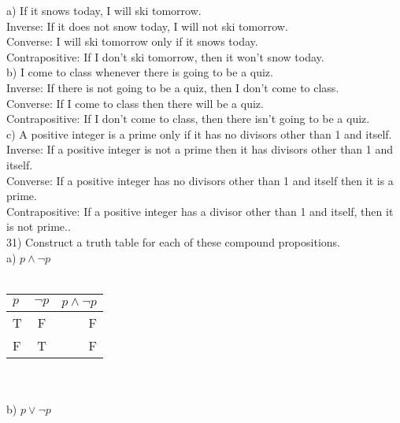 \documentclass{article}
\begin{document}
\begin{flushleft}
\setlength\parindent{24pt}a) If it snows today, I will ski tomorrow.\\
\setlength\parindent{48pt}Inverse: If it does not snow today, I will not ski tomorrow.\\
\setlength\parindent{48pt}Converse: I will ski tomorrow only if it snows today.\\
\setlength\parindent{48pt}Contrapositive: If I don't ski tomorrow, then it won't snow today.\\
\setlength\parindent{24pt}b) I come to class whenever there is going to be a quiz.\\
\setlength\parindent{48pt}Inverse: If there is not going to be a quiz, then I don't come to class.\\
\setlength\parindent{48pt}Converse: If I come to class then there will be a quiz.\\
\setlength\parindent{48pt}Contrapositive: If I don't come to class, then there isn't going to be a quiz.\\
\setlength\parindent{24pt}c) A positive integer is a prime only if it has no divisors other than 1 and itself.\\
\setlength\parindent{48pt}Inverse: If a positive integer is not a prime then it has divisors other than 1 and itself.\\
\setlength\parindent{48pt}Converse: If a positive integer has no divisors other than 1 and itself then it is a prime.\\
\setlength\parindent{48pt}Contrapositive: If a positive integer has a divisor other than 1 and itself, then it is not prime..\\
\setlength\parindent{0pt}31) Construct a truth table for each of these compound propositions.\\
\setlength\parindent{24pt}a) $p \land \neg p$\\
\setlength\parindent{24pt}~\\
\begin{tabular} {| l | c || r |}
  \hline
  $p$ & $\neg p$ & $p \land \neg p$ \\ \hline
  T & F & F \\ \hline
  F & T & F \\ \hline
\end{tabular}\\
~\\\setlength\parindent{24pt}b) $p \lor \neg p$\\
~\\\begin{tabular} {| l | c || r |}

\end{tabular}
\end{flushleft}
\end{document}
